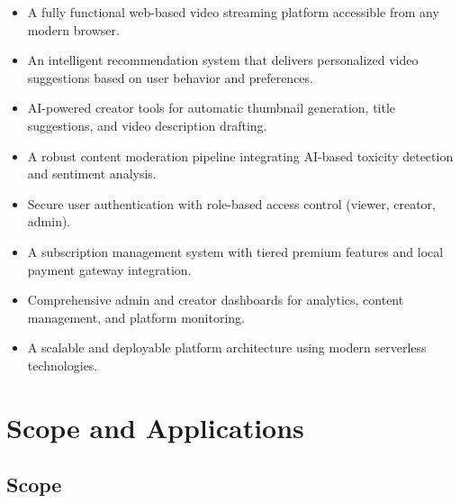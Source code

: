 \begin{itemize}[leftmargin=2cm]
  \item A fully functional web-based video streaming platform accessible from any modern browser.
  \item An intelligent recommendation system that delivers personalized video suggestions based on user behavior and preferences.
  \item AI-powered creator tools for automatic thumbnail generation, title suggestions, and video description drafting.
  \item A robust content moderation pipeline integrating AI-based toxicity detection and sentiment analysis.
  \item Secure user authentication with role-based access control (viewer, creator, admin).
  \item A subscription management system with tiered premium features and local payment gateway integration.
  \item Comprehensive admin and creator dashboards for analytics, content management, and platform monitoring.
  \item A scalable and deployable platform architecture using modern serverless technologies.
\end{itemize}

\section{Scope and Applications}

\subsection{Scope}

